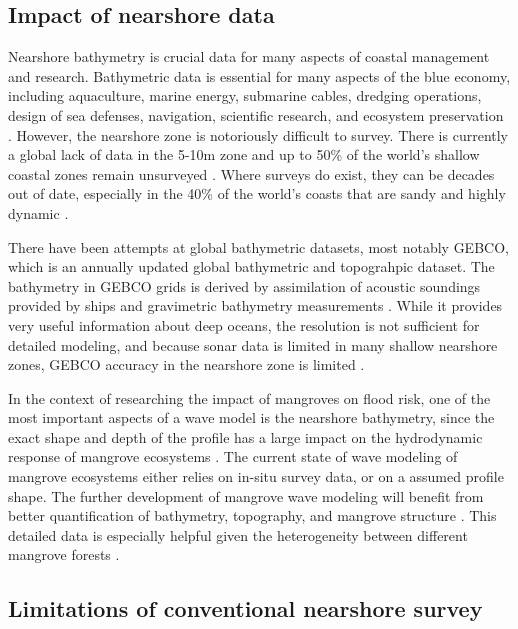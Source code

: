 \subsection{Impact of nearshore data}

Nearshore bathymetry is crucial data for many aspects of coastal management and research. Bathymetric data is essential for many aspects of the blue economy, including aquaculture, marine energy, submarine cables, dredging operations, design of sea defenses, navigation, scientific research, and ecosystem preservation \parencite{Cesbron2021,Ashphaq2021}. However, the nearshore zone is notoriously difficult to survey. There is currently a global lack of data in the 5-10m zone \parencite{Albright2021} and up to 50\% of the world's shallow coastal zones remain unsurveyed \parencite{IHO/OHI2022}. Where surveys do exist, they can be decades out of date, especially in the 40\% of the world's coasts that are sandy and highly dynamic \parencite{Almar2021e}.  

There have been attempts at global bathymetric datasets, most notably GEBCO, which is an annually updated global bathymetric and topograhpic dataset. The bathymetry in GEBCO grids is derived by assimilation of acoustic soundings provided by ships and gravimetric bathymetry measurements \parencite{Cesbron2021}. While it provides very useful information about deep oceans, the resolution is not sufficient for detailed modeling, and because sonar data is limited in many shallow nearshore zones, GEBCO accuracy in the nearshore zone is limited \parencite{add}.

In the context of researching the impact of mangroves on flood risk, one of the most important aspects of a wave model is the nearshore bathymetry, since the exact shape and depth of the profile has a large impact on the hydrodynamic response of mangrove ecosystems \parencite{Horstman2014,Maza2019}. The current state of wave modeling of mangrove ecosystems either relies on in-situ survey data, or on a assumed profile shape. The further development of mangrove wave modeling will benefit from better quantification of bathymetry, topography, and mangrove structure \parencite{Menendez2020}. This detailed data is especially helpful given the heterogeneity between different mangrove forests \parencite{Mazda2013}.

\subsection{Limitations of conventional nearshore survey}

